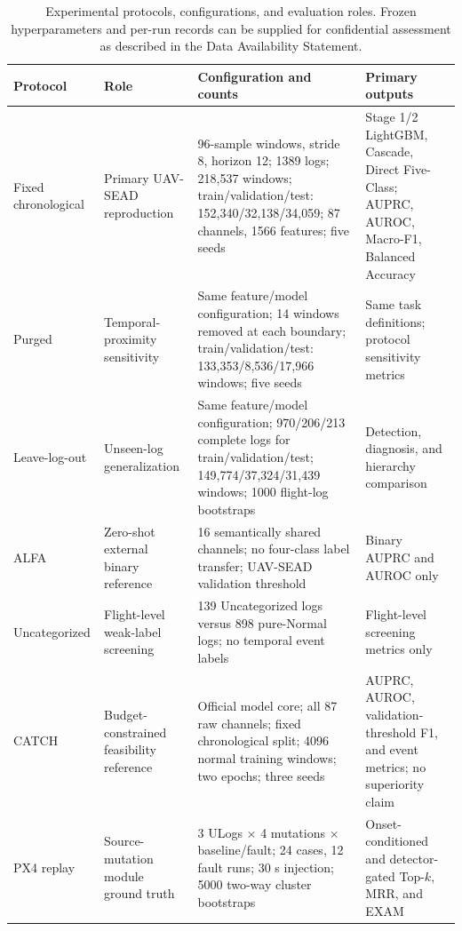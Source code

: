 \begin{table}[H]
\caption{Experimental protocols, configurations, and evaluation roles. Frozen hyperparameters and per-run records can be supplied for confidential assessment as described in the Data Availability Statement.\label{tab:protocol}}
\small
\begin{tabularx}{\textwidth}{p{2.2cm} p{2.4cm} X p{2.6cm}}
\toprule
\textbf{Protocol} & \textbf{Role} & \textbf{Configuration and counts} & \textbf{Primary outputs}\\
\midrule
Fixed chronological & Primary UAV-SEAD reproduction & 96-sample windows, stride 8, horizon 12; 1389 logs; 218,537 windows; train/validation/test: 152,340/32,138/34,059; 87 channels, 1566 features; five seeds & Stage 1/2 LightGBM, Cascade, Direct Five-Class; AUPRC, AUROC, Macro-F1, Balanced Accuracy\\
Purged & Temporal-proximity sensitivity & Same feature/model configuration; 14 windows removed at each boundary; train/validation/test: 133,353/8,536/17,966 windows; five seeds & Same task definitions; protocol sensitivity metrics\\
Leave-log-out & Unseen-log generalization & Same feature/model configuration; 970/206/213 complete logs for train/validation/test; 149,774/37,324/31,439 windows; 1000 flight-log bootstraps & Detection, diagnosis, and hierarchy comparison\\
ALFA & Zero-shot external binary reference & 16 semantically shared channels; no four-class label transfer; UAV-SEAD validation threshold & Binary AUPRC and AUROC only\\
Uncategorized & Flight-level weak-label screening & 139 Uncategorized logs versus 898 pure-Normal logs; no temporal event labels & Flight-level screening metrics only\\
CATCH & Budget-constrained feasibility reference & Official model core; all 87 raw channels; fixed chronological split; 4096 normal training windows; two epochs; three seeds & AUPRC, AUROC, validation-threshold F1, and event metrics; no superiority claim\\
PX4 replay & Source-mutation module ground truth & 3 ULogs $\times$ 4 mutations $\times$ baseline/fault; 24 cases, 12 fault runs; 30 s injection; 5000 two-way cluster bootstraps & Onset-conditioned and detector-gated Top-$k$, MRR, and EXAM\\
\bottomrule
\end{tabularx}
\end{table}
